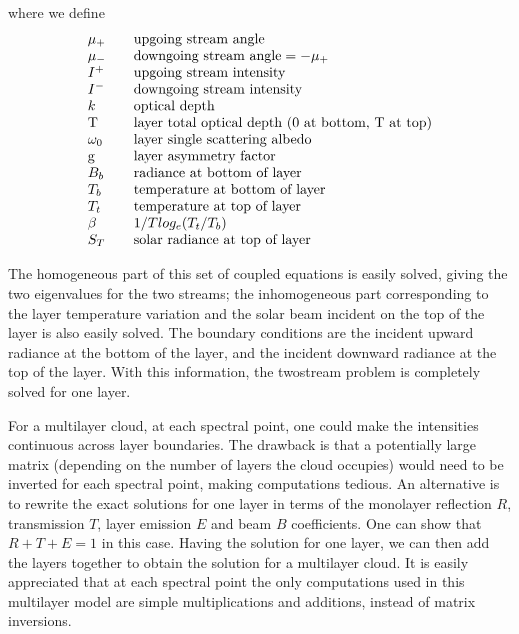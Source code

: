 \documentclass[12pt]{article}
\begin{document}
{{{{where we define
\[
\begin{array}{lcl}
\mu_{+}            & & \mbox{upgoing stream angle} \\
\mu_{-}            & & \mbox{downgoing stream angle} = -\mu_{+} \\
I^{+}              & & \mbox{upgoing stream intensity} \\
I^{-}              & & \mbox{downgoing stream intensity} \\
k               & & \mbox{optical depth} \\
$T$           & & \mbox{layer total optical depth (0 at bottom, T at top)} \\
\omega_{0}         & & \mbox{layer single scattering albedo} \\
$g$         & & \mbox{layer asymmetry factor} \\
B_{b}        & & \mbox{radiance at bottom of layer} \\
T_{b}        & & \mbox{temperature at bottom of layer} \\
T_{t}        & & \mbox{temperature at top of layer} \\
\beta        & & 1/T log_{e}(T_{t}/T_{b}) \\
S_{T}        & & \mbox{solar radiance at top of layer} 
\end{array}
\]

The homogeneous part of this set of coupled equations is easily solved, giving
the two eigenvalues for the two streams; the inhomogeneous part corresponding 
to the layer temperature variation and the solar beam incident on the top of 
the layer is also easily solved. The boundary conditions are the incident
upward radiance at the bottom of the layer, and the incident downward 
radiance at the top of the layer. With this information, the twostream 
problem is completely solved for one layer.

For a multilayer cloud, at each spectral point, one could make the intensities
continuous across layer boundaries. The drawback is that a potentially large 
matrix (depending on the number of layers the cloud occupies) would need to 
be inverted for each spectral point, making computations tedious. An 
alternative is to rewrite the exact solutions for one layer in terms of the 
monolayer reflection $R$, transmission $T$, layer 
emission $E$ and beam $B$ coefficients. One can show that $R+T+E = 1$ in this 
case. Having the solution for one layer, we can then add the layers together 
to obtain the solution for a multilayer cloud. It is easily appreciated 
that at each spectral point the only computations used in this multilayer 
model are simple multiplications and additions, instead of matrix inversions.

}}}}
\end{document}
